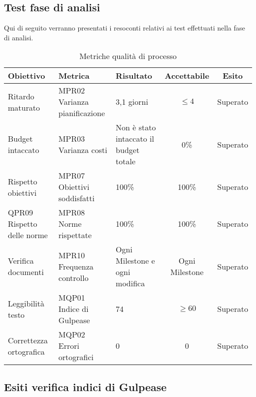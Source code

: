\documentclass[../piano_di_qualifica.tex]{subfiles}
\begin{document}
\subsection{Test fase di analisi}
Qui di seguito verranno presentati i resoconti relativi ai test effettuati nella fase di analisi. \par

\begin{table}[!ht]
	\centering
	\begin{tabular}{|p{3cm}|p{3.3cm}|l|c|c|}
		\hline
		\rowcolor{lightgray}
		\textbf{Obiettivo}  & \textbf{Metrica} & \textbf{Risultato} & \textbf{Accettabile} & \textbf{Esito} \\
		\hline
		Ritardo maturato & MPR02 Varianza pianificazione  & 3,1 giorni  & \(\leq 4\) & Superato  \\
		\hline
		Budget intaccato   & MPR03 Varianza costi   &  Non è stato intaccato il budget totale    &  0\%  &  Superato\\
		\hline
		Rispetto obiettivi   & MPR07 Obiettivi soddisfatti     & 100\%   & 100\% & Superato  \\
		\hline
		QPR09 Rispetto delle norme  & MPR08 Norme rispettate   & 100\%  & 100\%   & Superato\\
		\hline
		Verifica documenti   & MPR10 Frequenza controllo    & Ogni Milestone e ogni modifica   & Ogni Milestone    & Superato \\
		\hline
		Leggibilità testo & MQP01 Indice di Gulpease  & 74  & \(\ge 60\)  & Superato \\
		\hline
		Correttezza ortografica   & MQP02 Errori ortografici   &     0    &  0 & Superato  \\
		\hline
	\end{tabular}
	\caption{Metriche qualità di processo}
\end{table}


\subsection{Esiti verifica indici di Gulpease}
\label{sub:verif_gul}
\end{document}
